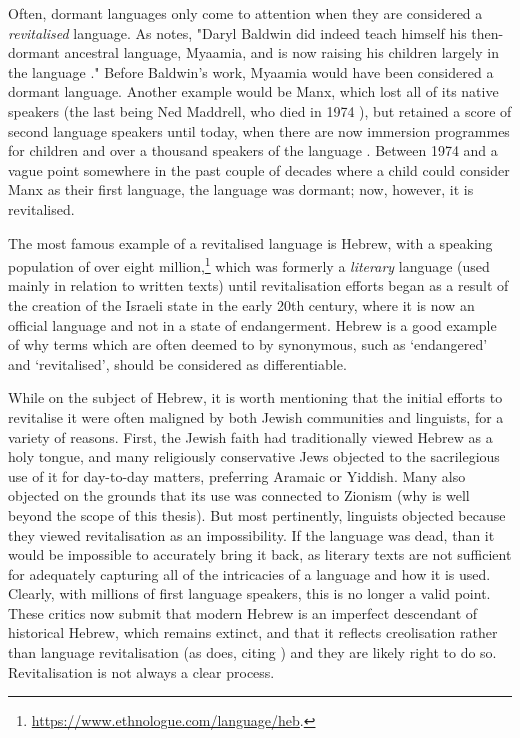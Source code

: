 Often, dormant languages only come to attention when they are considered a \textit{revitalised} language. As \citet{warner2007ethics} notes, "Daryl Baldwin did indeed teach himself his then-dormant ancestral language, Myaamia, and is now raising his children largely in the language \citep{hinton2001sleeping, leonard2004acquisition}." Before Baldwin's work, Myaamia would have been considered a dormant language. Another example would be Manx, which lost all of its native speakers (the last being Ned Maddrell, who died in 1974 \citep{wilson2008revitalization}), but retained a score of second language speakers until today, when there are now immersion programmes for children and over a thousand speakers of the language \citep{clague2009manx}. Between 1974 and a vague point somewhere in the past couple of decades where a child could consider Manx as their first language, the language was dormant; now, however, it is revitalised.

The most famous example of a revitalised language is Hebrew, with a speaking population of over eight million,\footnote{\href{https://www.ethnologue.com/language/heb}{https://www.ethnologue.com/language/heb}. } which was formerly a {\it literary} language (used mainly in relation to written texts) until revitalisation efforts began as a result of the creation of the Israeli state in the early 20th century, where it is now an official language and not in a state of endangerment. Hebrew is a good example of why terms which are often deemed to by synonymous, such as `endangered' and `revitalised', should be considered as differentiable.

While on the subject of Hebrew, it is worth mentioning that the initial efforts to revitalise it were often maligned by both Jewish communities and linguists, for a variety of reasons. First, the Jewish faith had traditionally viewed Hebrew as a holy tongue, and many religiously conservative Jews objected to the sacrilegious use of it for day-to-day matters, preferring Aramaic or Yiddish. Many also objected on the grounds that its use was connected to Zionism (why is well beyond the scope of this thesis). But most pertinently, linguists objected because they viewed revitalisation as an impossibility. If the language was dead, than it would be impossible to accurately bring it back, as literary texts are not sufficient for adequately capturing all of the intricacies of a language and how it is used. Clearly, with millions of first language speakers, this is no longer a valid point. These critics now submit that modern Hebrew is an imperfect descendant of historical Hebrew, which remains extinct, and that it reflects creolisation rather than language revitalisation (as \citet{kornai2013digital} does, citing \citet{bickerton2016roots,izreel2003emergence}) and they are likely right to do so. Revitalisation is not always a clear process.

